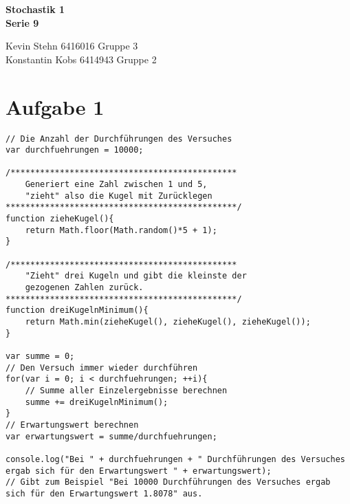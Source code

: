 \documentclass[10pt,a4paper]{article}
\begin{document}
\begin{center}
\textbf{Stochastik 1 \\ Serie 9 \\}
\end{center}

\begin{flushright}
Kevin Stehn 6416016 Gruppe 3 \\
Konstantin Kobs 6414943 Gruppe 2
\end{flushright}

\section*{Aufgabe 1}
\begin{lstlisting}
// Die Anzahl der Durchführungen des Versuches
var durchfuehrungen = 10000;

/**********************************************
	Generiert eine Zahl zwischen 1 und 5,
	"zieht" also die Kugel mit Zurücklegen
***********************************************/
function zieheKugel(){
	return Math.floor(Math.random()*5 + 1);
}

/**********************************************
	"Zieht" drei Kugeln und gibt die kleinste der
	gezogenen Zahlen zurück.
***********************************************/
function dreiKugelnMinimum(){
	return Math.min(zieheKugel(), zieheKugel(), zieheKugel());
}

var summe = 0;
// Den Versuch immer wieder durchführen
for(var i = 0; i < durchfuehrungen; ++i){
	// Summe aller Einzelergebnisse berechnen
	summe += dreiKugelnMinimum();
}
// Erwartungswert berechnen
var erwartungswert = summe/durchfuehrungen;

console.log("Bei " + durchfuehrungen + " Durchführungen des Versuches ergab sich für den Erwartungswert " + erwartungswert);
// Gibt zum Beispiel "Bei 10000 Durchführungen des Versuches ergab sich für den Erwartungswert 1.8078" aus.
\end{lstlisting}
\end{document}
